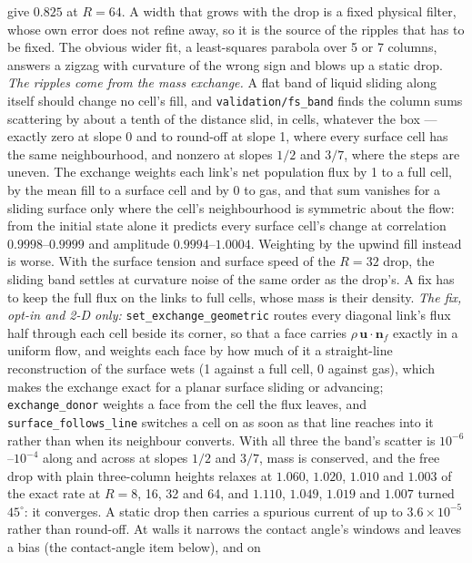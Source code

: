 \documentclass[11pt,a4paper]{article}
\newcommand{\code}[1]{\texttt{\small #1}}
\begin{document}
\begin{enumerate}[leftmargin=1.4em,itemsep=4pt]
  give $0.825$ at $R=64$. A width that grows with the drop is a fixed physical
  filter, whose own error does not refine away, so it is the source of the
  ripples that has to be fixed. The obvious wider fit, a least-squares parabola
  over 5 or 7 columns, answers a zigzag with curvature of the wrong sign and
  blows up a static drop. \emph{The ripples come from the mass exchange.} A
  flat band of liquid sliding along itself should change no cell's fill, and
  \code{validation/fs\_band} finds the column sums scattering by about a tenth
  of the distance slid, in cells, whatever the box --- exactly zero at slope 0
  and to round-off at slope 1, where every surface cell has the same
  neighbourhood, and nonzero at slopes $1/2$ and $3/7$, where the steps are
  uneven. The exchange weights each link's net population flux by 1 to a full
  cell, by the mean fill to a surface cell and by 0 to gas, and that sum
  vanishes for a sliding surface only where the cell's neighbourhood is
  symmetric about the flow: from the initial state alone it predicts every
  surface cell's change at correlation $0.9998$--$0.9999$ and amplitude
  $0.9994$--$1.0004$. Weighting by the upwind fill instead is worse. With the
  surface tension and surface speed of the $R=32$ drop, the sliding band
  settles at curvature noise of the same order as the drop's. A fix has to
  keep the full flux on the links to full cells, whose mass is their density.
  \emph{The fix, opt-in and 2-D only:} \code{set\_exchange\_geometric} routes
  every diagonal link's flux half through each cell beside its corner, so that
  a face carries $\rho\,\mathbf{u}\cdot\mathbf{n}_f$ exactly in a uniform
  flow, and weights each face by how much of it a straight-line reconstruction
  of the surface wets (1 against a full cell, 0 against gas), which makes the
  exchange exact for a planar surface sliding or advancing;
  \code{exchange\_donor} weights a face from the cell the flux leaves, and
  \code{surface\_follows\_line} switches a cell on as soon as that line
  reaches into it rather than when its neighbour converts. With all three the
  band's scatter is $10^{-6}$--$10^{-4}$ along and across at slopes $1/2$ and
  $3/7$, mass is conserved, and the free drop with plain three-column heights
  relaxes at $1.060$, $1.020$, $1.010$ and $1.003$ of the exact rate at
  $R=8$, 16, 32 and 64, and $1.110$, $1.049$, $1.019$ and $1.007$ turned
  $45^\circ$: it converges. A static drop then carries a spurious current of up
  to $3.6\times10^{-5}$ rather than round-off. At walls it narrows the contact
  angle's windows and leaves a bias (the contact-angle item below), and on

\end{enumerate}
\end{document}

